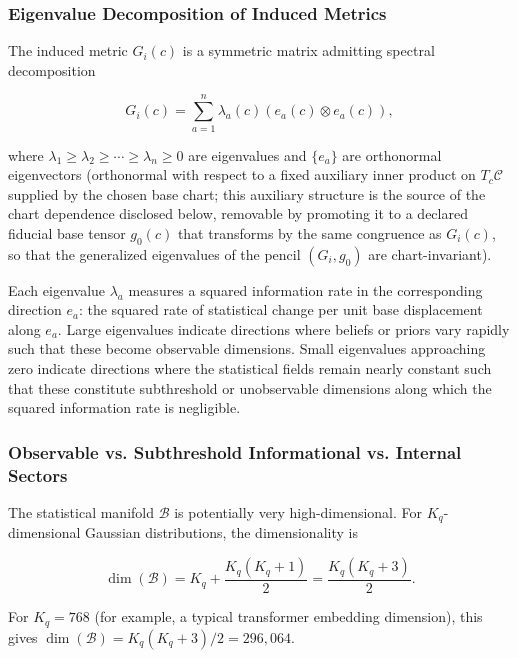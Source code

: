 \documentclass[11pt]{article}
\begin{document}
\subsubsection{Eigenvalue Decomposition of Induced Metrics}

The induced metric $G_i(c)$ is a symmetric matrix admitting spectral decomposition

\begin{equation}
G_i(c) = \sum_{a=1}^n \lambda_a(c)  (e_a(c) \otimes e_a(c)),
\end{equation}

where $\lambda_1 \geq \lambda_2 \geq \cdots \geq \lambda_n \geq 0$ are eigenvalues and $\{e_a\}$ are orthonormal eigenvectors (orthonormal with respect to a fixed auxiliary inner product on $T_c\mathcal{C}$ supplied by the chosen base chart; this auxiliary structure is the source of the chart dependence disclosed below, removable by promoting it to a declared fiducial base tensor $g_0(c)$ that transforms by the same congruence as $G_i(c)$, so that the generalized eigenvalues of the pencil $(G_i, g_0)$ are chart-invariant).

Each eigenvalue $\lambda_a$ measures a squared information rate in the corresponding direction $e_a$: the squared rate of statistical change per unit base displacement along $e_a$. Large eigenvalues indicate directions where beliefs or priors vary rapidly such that these become observable dimensions. Small eigenvalues approaching zero indicate directions where the statistical fields remain nearly constant such that these constitute subthreshold or unobservable dimensions along which the squared information rate is negligible.

\subsubsection{Observable vs. Subthreshold Informational vs. Internal Sectors}

The statistical manifold $\mathcal{B}$ is potentially very high-dimensional. For $K_q$-dimensional Gaussian distributions, the dimensionality is

\begin{equation}
\dim(\mathcal{B}) = K_q + \frac{K_q(K_q+1)}{2} = \frac{K_q(K_q+3)}{2}.
\end{equation}

For $K_q=768$ (for example, a typical transformer embedding dimension), this gives $\dim(\mathcal{B}) = K_q(K_q+3)/2 = 296{,}064$.
\end{document}
